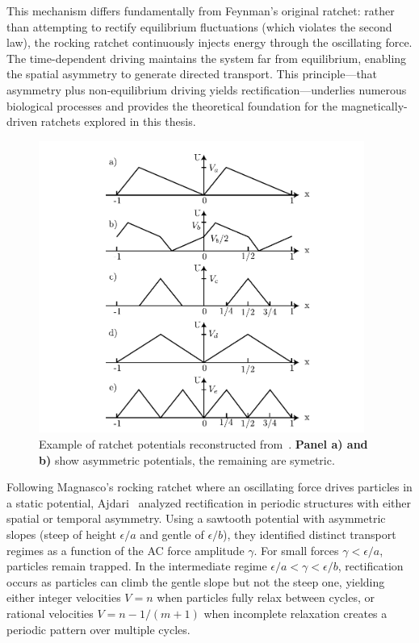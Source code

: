 This mechanism differs fundamentally from Feynman's original ratchet: rather than attempting to rectify equilibrium fluctuations (which violates the second law), the rocking ratchet continuously injects energy through the oscillating force. The time-dependent driving maintains the system far from equilibrium, enabling the spatial asymmetry to generate directed transport. This principle—that asymmetry plus non-equilibrium driving yields rectification—underlies numerous biological processes and provides the theoretical foundation for the magnetically-driven ratchets explored in this thesis.

\begin{figure}[h]
  \begin{center}
    \includegraphics[width=0.95\textwidth]{figures/ratchetpotentialexample.pdf}
  \end{center}
  \caption[Ratchet potential examples.]{Example of ratchet potentials reconstructed from~\cite{kanada1999thermal}. \textbf{Panel a) and b)} show asymmetric potentials, the remaining are symetric. }\label{fig:ratchetpotential} %
\end{figure}


Following Magnasco's rocking ratchet where an oscillating force drives particles in a static potential, Ajdari~\cite{ajdari1994rectified} analyzed rectification in periodic structures with either spatial or temporal asymmetry. Using a sawtooth potential with asymmetric slopes (steep of height $\epsilon/a$ and gentle of $\epsilon/b$), they identified distinct transport regimes as a function of the AC force amplitude $\gamma$. 
For small forces $\gamma < \epsilon/a$, particles remain trapped. In the intermediate regime $\epsilon/a < \gamma < \epsilon/b$, rectification occurs as particles can climb the gentle slope but not the steep one, yielding either integer velocities $V = n$ when particles fully relax between cycles, or rational velocities $V = n - 1/(m+1)$ when incomplete relaxation creates a periodic pattern over multiple cycles.


